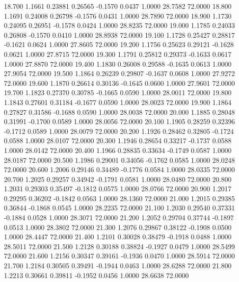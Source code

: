   18.700   1.1661   0.23881   0.26565  -0.1570   0.0437   1.0000  28.7582  72.0000
  18.800   1.1691   0.24008   0.26798  -0.1576   0.0431   1.0000  28.7890  72.0000
  18.900   1.1730   0.24095   0.26951  -0.1578   0.0424   1.0000  28.8235  72.0000
  19.000   1.1785   0.24033   0.26808  -0.1570   0.0410   1.0000  28.8938  72.0000
  19.100   1.1728   0.25427   0.28817  -0.1621   0.0624   1.0000  27.8605  72.0000
  19.200   1.1756   0.25623   0.29121  -0.1628   0.0621   1.0000  27.8715  72.0000
  19.300   1.1791   0.25812   0.29373  -0.1633   0.0617   1.0000  27.8870  72.0000
  19.400   1.1830   0.26008   0.29588  -0.1635   0.0613   1.0000  27.9054  72.0000
  19.500   1.1864   0.26239   0.29807  -0.1637   0.0608   1.0000  27.9272  72.0000
  19.600   1.1870   0.26614   0.30136  -0.1645   0.0600   1.0000  27.9601  72.0000
  19.700   1.1823   0.27370   0.30785  -0.1665   0.0590   1.0000  28.0011  72.0000
  19.800   1.1843   0.27601   0.31184  -0.1677   0.0590   1.0000  28.0023  72.0000
  19.900   1.1864   0.27827   0.31586  -0.1688   0.0590   1.0000  28.0038  72.0000
  20.000   1.1885   0.28048   0.31991  -0.1700   0.0589   1.0000  28.0056  72.0000
  20.100   1.1905   0.28259   0.32396  -0.1712   0.0589   1.0000  28.0079  72.0000
  20.200   1.1926   0.28462   0.32805  -0.1724   0.0588   1.0000  28.0107  72.0000
  20.300   1.1946   0.28654   0.33217  -0.1737   0.0588   1.0000  28.0142  72.0000
  20.400   1.1966   0.28835   0.33634  -0.1749   0.0587   1.0000  28.0187  72.0000
  20.500   1.1986   0.29001   0.34056  -0.1762   0.0585   1.0000  28.0248  72.0000
  20.600   1.2006   0.29146   0.34489  -0.1776   0.0584   1.0000  28.0335  72.0000
  20.700   1.2025   0.29257   0.34942  -0.1791   0.0581   1.0000  28.0480  72.0000
  20.800   1.2031   0.29303   0.35497  -0.1812   0.0575   1.0000  28.0766  72.0000
  20.900   1.2017   0.29295   0.36202  -0.1842   0.0563   1.0000  28.1360  72.0000
  21.000   1.2015   0.29385   0.36844  -0.1868   0.0545   1.0000  28.2235  72.0000
  21.100   1.2030   0.29540   0.37331  -0.1884   0.0528   1.0000  28.3071  72.0000
  21.200   1.2052   0.29704   0.37744  -0.1897   0.0513   1.0000  28.3802  72.0000
  21.300   1.2076   0.29867   0.38122  -0.1908   0.0500   1.0000  28.4447  72.0000
  21.400   1.2101   0.30028   0.38479  -0.1918   0.0488   1.0000  28.5011  72.0000
  21.500   1.2128   0.30188   0.38824  -0.1927   0.0479   1.0000  28.5499  72.0000
  21.600   1.2156   0.30347   0.39161  -0.1936   0.0470   1.0000  28.5914  72.0000
  21.700   1.2184   0.30505   0.39491  -0.1944   0.0463   1.0000  28.6288  72.0000
  21.800   1.2213   0.30661   0.39811  -0.1952   0.0456   1.0000  28.6638  72.0000
